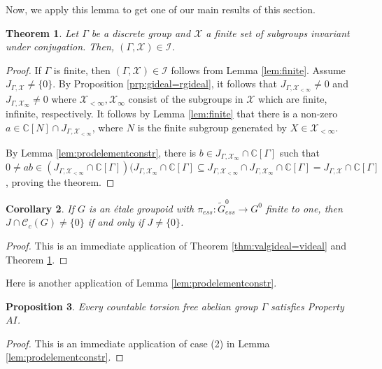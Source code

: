 \documentclass[a4paper, 12pt]{amsart}
\newtheorem{thm}{Theorem}[section]
\newtheorem{cor}[thm]{Corollary}
\newtheorem{prp}[thm]{Proposition}
\theoremstyle{definition}
\theoremstyle{remark}
\numberwithin{equation}{section}
\begin{document}
Now, we apply this lemma to get one of our main results of this section.

\begin{thm}
\label{thm:finitenumberofsgs}
    Let $\Gamma$ be a discrete group and $\mathcal{X}$ a finite set of subgroups invariant under conjugation. Then, $(\Gamma, \mathcal{X})\in \mathcal{I}$.
\end{thm}



\begin{proof}
    If $\Gamma$ is finite, then $(\Gamma,\mathcal{X})\in\mathcal{I}$ follows from Lemma \ref{lem:finite}.
    Assume $J_{\Gamma,\mathcal{X}}\neq \{0\}$. By Proposition \ref{prp:gideal=rgideal}, it follows that  $J_{\Gamma, \mathcal{X}_{<\infty}}\neq 0$ and $ J_{\Gamma,\mathcal{X}_{\infty}}\neq 0$ where $\mathcal{X}_{<\infty}, \mathcal{X}_{\infty}$ consist of the subgroups in $\mathcal{X}$ which are finite, infinite, respectively. It follows by Lemma \ref{lem:finite} that there is a non-zero $a\in \mathbb{C}[N]\cap J_{\Gamma,\mathcal{X}_{<\infty}}$, where $N$ is the finite subgroup generated by $X\in \mathcal{X}_{<\infty}$.

    By Lemma \ref{lem:prodelementconstr}, there is $b\in J_{\Gamma, \mathcal{X}_{\infty}}\cap\mathbb{C}[\Gamma]$ such that $0\neq ab\in (J_{\Gamma,\mathcal{X}_{<\infty}}\cap\mathbb{C}[\Gamma])(J_{\Gamma,\mathcal{X}_{\infty}}\cap\mathbb{C}[\Gamma]\subseteq J_{\Gamma, \mathcal{X}_{<\infty}}\cap J_{\Gamma,\mathcal{X}_{\infty}}\cap\mathbb{C}[\Gamma]= J_{\Gamma,\mathcal{X}}\cap\mathbb{C}[\Gamma]$, proving the theorem.
\end{proof}

\begin{cor}
\label{cor:finitetooneproj}
    If $G$ is an \'etale groupoid with $\pi_{ess}:\tilde{G}^{0}_{ess}\to G^{0}$ finite to one, then $J\cap\mathscr{C}_{c}(G)\neq \{0\}$ if and only if $J\neq \{0\}$.
\end{cor}
\begin{proof}
    This is an immediate application of Theorem \ref{thm:valgideal=videal} and Theorem \ref{thm:finitenumberofsgs}.
\end{proof}

Here is another application of Lemma \ref{lem:prodelementconstr}.

\begin{prp}
\label{prp:freeabelianAI}
    Every countable torsion free abelian group $\Gamma$ satisfies Property $AI$.
\end{prp}
\begin{proof}
This is an immediate application of case (2) in Lemma \ref{lem:prodelementconstr}.
\end{proof}
\end{document}
